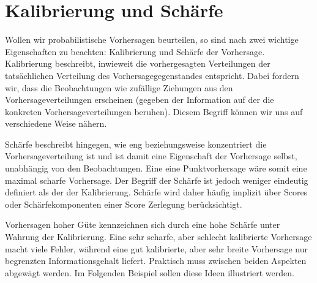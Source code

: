\section{Kalibrierung und Schärfe} \label{seq:cal_sharp}
Wollen wir probabilistische Vorhersagen beurteilen, so sind nach \textcite{gneiting2014probabilistic} zwei wichtige Eigenschaften zu beachten: Kalibrierung und Schärfe der Vorhersage. Kalibrierung beschreibt, inwieweit die vorhergesagten Verteilungen der tatsächlichen Verteilung des Vorhersagegegenstandes entspricht. Dabei fordern wir, dass die Beobachtungen wie zufällige Ziehungen aus den Vorhersageverteilungen erscheinen (gegeben der Information auf der die konkreten Vorhersageverteilungen beruhen). Diesem Begriff können wir uns auf verschiedene Weise nähern.

Schärfe beschreibt hingegen, wie eng beziehungsweise konzentriert die Vorhersageverteilung ist und ist damit eine Eigenschaft der Vorhersage selbst, unabhängig von den Beobachtungen. Eine eine Punktvorhersage wäre somit eine maximal scharfe Vorhersage. Der Begriff der Schärfe ist jedoch weniger eindeutig definiert als der der Kalibrierung. Schärfe wird daher häufig implizit über Scores oder Schärfekomponenten einer Score Zerlegung berücksichtigt.

Vorhersagen hoher Güte kennzeichnen sich durch eine hohe Schärfe unter Wahrung der Kalibrierung. Eine sehr scharfe, aber schlecht kalibrierte Vorhersage macht viele Fehler, während eine gut kalibrierte, aber sehr breite Vorhersage nur begrenzten Informationsgehalt liefert. Praktisch muss zwischen beiden Aspekten abgewägt werden. Im Folgenden Beispiel sollen diese Ideen illustriert werden.

